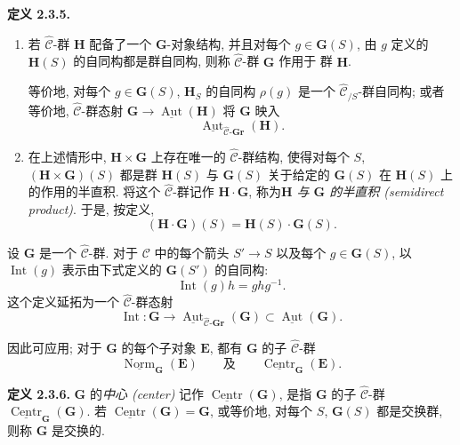 \medskip
\noindent{}\textbf{定义 2.3.5.}
\begin{enumerate}
  \item[(a)]
  若 \(\widehat{\mathscr C}\)-群 \(\mathbf H\) 配备了一个
  \(\mathbf G\)-对象结构, 并且对每个 \(g\in\mathbf G(S)\),
  由 \(g\) 定义的 \(\mathbf H(S)\) 的自同构都是群自同构,
  则称 \(\widehat{\mathscr C}\)-群 \(\mathbf G\) 作用于
  群 \(\mathbf H\).

  等价地, 对每个 \(g\in\mathbf G(S)\), \(\mathbf H_S\) 的自同构
  \(\rho(g)\) 是一个 \(\widehat{\mathscr C}_{/S}\)-群自同构;
  或者等价地, \(\widehat{\mathscr C}\)-群态射
  \(\mathbf G\to\underline{\operatorname{Aut}}(\mathbf H)\) 将
  \(\mathbf G\) 映入
  \[
    \underline{\operatorname{Aut}}_{
      \widehat{\mathscr C}\text{-}\mathbf{Gr}}(\mathbf H).
  \]

  \item[(b)]
  在上述情形中, \(\mathbf H\times\mathbf G\) 上存在唯一的
  \(\widehat{\mathscr C}\)-群结构, 使得对每个 \(S\),
  \((\mathbf H\times\mathbf G)(S)\) 都是群 \(\mathbf H(S)\) 与
  \(\mathbf G(S)\) 关于给定的 \(\mathbf G(S)\) 在
  \(\mathbf H(S)\) 上的作用的半直积. 将这个
  \(\widehat{\mathscr C}\)-群记作 \(\mathbf H\mathbin{\cdot}\mathbf G\),
  称为\emph{\(\mathbf H\) 与 \(\mathbf G\) 的半直积 (semidirect product)}.
  于是, 按定义,
  \[
    (\mathbf H\mathbin{\cdot}\mathbf G)(S)
      =\mathbf H(S)\mathbin{\cdot}\mathbf G(S).
  \]
\end{enumerate}

设 \(\mathbf G\) 是一个 \(\widehat{\mathscr C}\)-群.
对于 \(\mathscr C\) 中的每个箭头 \(S'\to S\) 以及每个
\(g\in\mathbf G(S)\), 以 \(\operatorname{Int}(g)\) 表示由下式定义的
\(\mathbf G(S')\) 的自同构:
\[
  \operatorname{Int}(g)h=ghg^{-1}.
\]
这个定义延拓为一个 \(\widehat{\mathscr C}\)-群态射
\[
  \operatorname{Int}:\mathbf G\longrightarrow
  \underline{\operatorname{Aut}}_{
    \widehat{\mathscr C}\text{-}\mathbf{Gr}}(\mathbf G)
  \subset
  \underline{\operatorname{Aut}}(\mathbf G).
\]

因此可应用;
对于 \(\mathbf G\) 的每个子对象 \(\mathbf E\), 都有 \(\mathbf G\)
的子 \(\widehat{\mathscr C}\)-群
\[
  \underline{\operatorname{Norm}}_{\mathbf G}(\mathbf E)
  \qquad\text{及}\qquad
  \underline{\operatorname{Centr}}_{\mathbf G}(\mathbf E).
\]

\medskip
{}
\noindent\textbf{定义 2.3.6.}
\(\mathbf G\) 的\emph{中心 (center)} 记作
\(\underline{\operatorname{Centr}}(\mathbf G)\), 是指 \(\mathbf G\)
的子 \(\widehat{\mathscr C}\)-群
\(\underline{\operatorname{Centr}}_{\mathbf G}(\mathbf G)\).
若 \(\underline{\operatorname{Centr}}(\mathbf G)=\mathbf G\),
或等价地, 对每个 \(S\), \(\mathbf G(S)\) 都是交换群,
则称 \(\mathbf G\) 是交换的.

